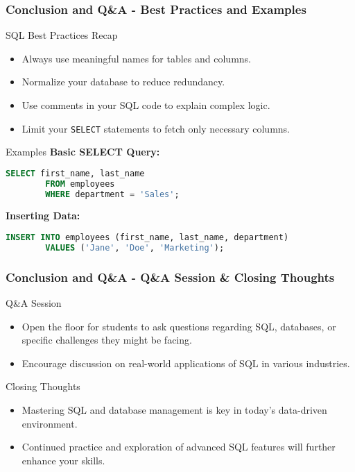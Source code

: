 \documentclass[aspectratio=169]{beamer}
\begin{document}
\begin{frame}[fragile]
    \frametitle{Conclusion and Q\&A - Best Practices and Examples}
    
    \begin{block}{SQL Best Practices Recap}
        \begin{itemize}
            \item Always use meaningful names for tables and columns.
            \item Normalize your database to reduce redundancy.
            \item Use comments in your SQL code to explain complex logic.
            \item Limit your \texttt{SELECT} statements to fetch only necessary columns.
        \end{itemize}
    \end{block}

    \begin{block}{Examples}
        \textbf{Basic SELECT Query:}
        \begin{lstlisting}[language=SQL]
        SELECT first_name, last_name 
        FROM employees 
        WHERE department = 'Sales';
        \end{lstlisting}
        
        \textbf{Inserting Data:}
        \begin{lstlisting}[language=SQL]
        INSERT INTO employees (first_name, last_name, department) 
        VALUES ('Jane', 'Doe', 'Marketing');
        \end{lstlisting}
    \end{block}
\end{frame}

\begin{frame}[fragile]
    \frametitle{Conclusion and Q\&A - Q\&A Session & Closing Thoughts}
    
    \begin{block}{Q\&A Session}
        \begin{itemize}
            \item Open the floor for students to ask questions regarding SQL, databases, or specific challenges they might be facing.
            \item Encourage discussion on real-world applications of SQL in various industries.
        \end{itemize}
    \end{block}
    
    \begin{block}{Closing Thoughts}
        \begin{itemize}
            \item Mastering SQL and database management is key in today's data-driven environment.
            \item Continued practice and exploration of advanced SQL features will further enhance your skills.
        \end{itemize}
    \end{block}
\end{frame}
\end{document}
